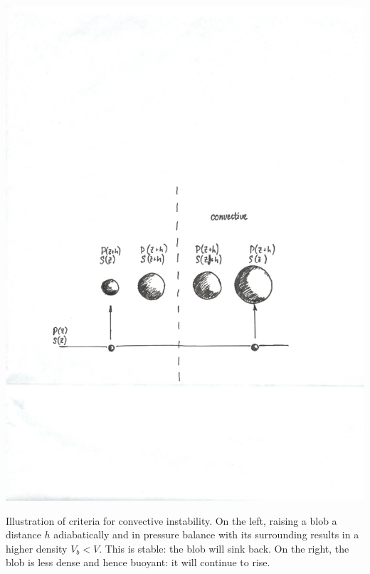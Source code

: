 \begin{marginfigure}
\includegraphics[width=\textwidth]{convective}
\caption[Illustration of criteria for convective instability.]{\label{f.convective-schematic}Illustration of criteria for convective instability.  On the left, raising a blob a distance $h$ adiabatically and in pressure balance with its surrounding results in a higher density $V_{b} < V$.  This is stable: the blob will sink back.  On the right, the blob is less dense and hence buoyant: it will continue to rise.}
\end{marginfigure}


